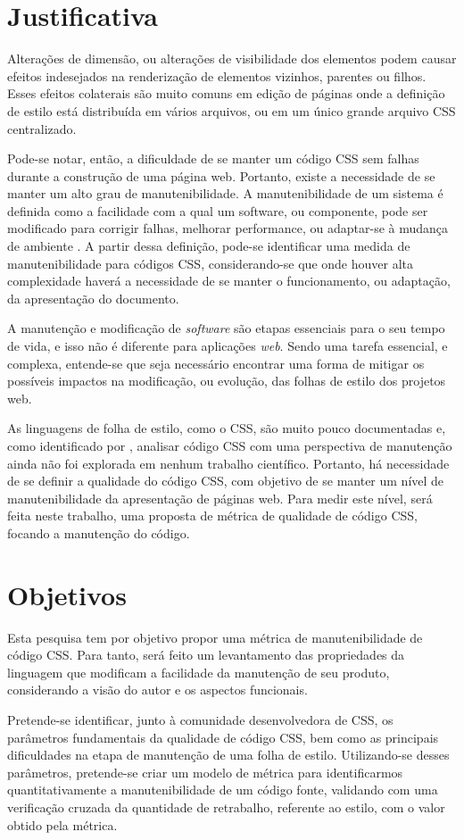 \section{Justificativa}

Alterações de dimensão, ou alterações de visibilidade dos elementos podem causar efeitos indesejados na renderização de elementos vizinhos, parentes ou filhos. Esses efeitos colaterais são muito comuns em edição de páginas onde a definição de estilo está distribuída em vários arquivos, ou em um único grande arquivo CSS centralizado.

Pode-se notar, então, a dificuldade de se manter um código CSS sem falhas durante a construção de uma página web. Portanto, existe a necessidade de se manter um alto grau de manutenibilidade. A manutenibilidade de um sistema é definida como a facilidade com a qual um software, ou componente, pode ser modificado para corrigir falhas, melhorar performance, ou adaptar-se à mudança de ambiente \cite{Ieee1990}. A partir dessa definição, pode-se identificar uma medida de manutenibilidade para códigos CSS, considerando-se que onde houver alta complexidade haverá a necessidade de se manter o funcionamento, ou adaptação, da apresentação do documento.

A manutenção e modificação de \textit{software} são etapas essenciais para o seu tempo de vida, e isso não é diferente para aplicações \textit{web}. Sendo uma tarefa essencial, e complexa, entende-se que seja necessário encontrar uma forma de mitigar os possíveis impactos na modificação, ou evolução, das folhas de estilo dos projetos web.

As linguagens de folha de estilo, como o CSS, são muito pouco documentadas \cite{Marden1999,Quint2007,Geneves2012} e, como identificado por , analisar código CSS com uma perspectiva de manutenção ainda não foi explorada em nenhum trabalho científico. Portanto, há necessidade de se definir a qualidade do código CSS, com objetivo de se manter um nível de manutenibilidade da apresentação de páginas web. Para medir este nível, será feita neste trabalho, uma proposta de métrica de qualidade de código CSS, focando a manutenção do código.

\section{Objetivos}
Esta pesquisa tem por objetivo propor uma métrica de manutenibilidade de código CSS. Para tanto, será feito um levantamento das propriedades da linguagem que modificam a facilidade da manutenção de seu produto, considerando a visão do autor e os aspectos funcionais.

Pretende-se identificar, junto à comunidade desenvolvedora de CSS, os parâmetros fundamentais da qualidade de código CSS, bem como as principais dificuldades na etapa de manutenção de uma folha de estilo. Utilizando-se desses parâmetros, pretende-se criar um modelo de métrica para identificarmos quantitativamente a manutenibilidade de um código fonte, validando com uma verificação cruzada da quantidade de retrabalho, referente ao estilo, com o valor obtido pela métrica. 